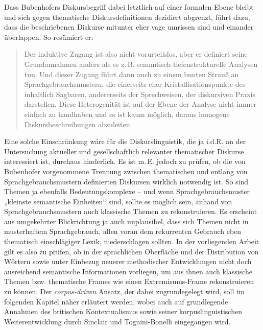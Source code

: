 Dass Bubenhofers Diskursbegriff dabei letztlich auf einer formalen Ebene bleibt und sich gegen thematische Diskursdefinitionen dezidiert abgrenzt, führt dazu, dass die beschriebenen Diskurse mitunter eher vage umrissen sind und einander überlappen. So resümiert er:

\begin{quote}
Der induktive Zugang ist also nicht vorurteilslos, aber er definiert seine Grundannahmen anders als es z.\,B. semantisch-tiefenstrukturelle Analysen tun. Und dieser Zugang führt dann auch zu einem bunten Strauß an Sprachgebrauchsmustern, die einerseits eher Kristallisationspunkte des inhaltlich Sagbaren, andererseits der Sprechweisen, der diskursiven Praxis darstellen. Diese Heterogenität ist auf der Ebene der Analyse nicht immer einfach zu handhaben und es ist kaum möglich, daraus homogene Diskursbeschreibungen abzuleiten. \autocite[311]{bubenhoferSprachgebrauchsmusterKorpuslinguistikAls2009}
\end{quote}

Eine solche Einschränkung wäre für die Diskurslinguistik, die ja i.d.R. an der Untersuchung aktueller und gesellschaftlich relevanter thematischer Diskurse interessiert ist, durchaus hinderlich. Es ist m.\,E. jedoch zu prüfen, ob die von Bubenhofer vorgenommene Trennung zwischen thematischen und entlang von Sprachgebrauchsmustern definierten Diskursen wirklich notwendig ist. So sind Themen ja ebenfalls Bedeutungskomplexe -- und wenn Sprachgebrauchsmuster „kleinste semantische Einheiten`` \autocite[336]{bubenhoferSprachgebrauchsmusterKorpuslinguistikAls2009} sind, sollte es möglich sein, anhand von Sprachgebrauchsmustern auch klassische Themen zu rekonstruieren. Es erscheint aus umgekehrter Blickrichtung ja auch unplausibel, dass sich Themen nicht in musterhaftem Sprachgebrauch, allen voran dem rekurrenten Gebrauch eben thematisch einschlägiger Lexik, niederschlagen sollten. In der vorliegenden Arbeit gilt es also zu prüfen, ob in der sprachlichen Oberfläche und der Distribution von Wörtern sowie unter Einbezug neuerer methodischer Entwicklungen nicht doch ausreichend semantische Informationen vorliegen, um aus ihnen auch klassische Themen bzw. thematische Frames wie einen Extremismus-Frame rekonstruieren zu können. Der \emph{corpus-driven} Ansatz, der dabei zugrundegelegt wird, soll im folgenden Kapitel näher erläutert werden, wobei auch auf grundlegende Annahmen des britischen Kontextualismus sowie seiner korpuslinguistischen Weiterentwicklung durch Sinclair und Tognini-Bonelli eingegangen wird.

